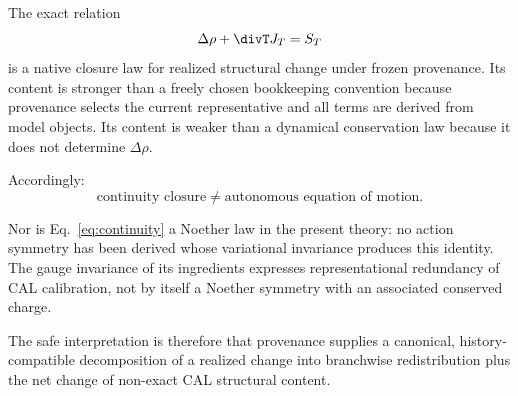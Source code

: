 The exact relation
\begin{equation}
\Delta\rho+\divT J_T=S_T
\end{equation}
is a native closure law for realized structural change under frozen provenance. Its content is stronger than a freely chosen bookkeeping convention because provenance selects the current representative and all terms are derived from model objects. Its content is weaker than a dynamical conservation law because it does not determine $\Delta\rho$.

Accordingly:
\begin{equation}
\boxed{
\text{continuity closure}
\neq
\text{autonomous equation of motion}.
}
\end{equation}

Nor is Eq.~\eqref{eq:continuity} a Noether law in the present theory: no action symmetry has been derived whose variational invariance produces this identity. The gauge invariance of its ingredients expresses representational redundancy of CAL calibration, not by itself a Noether symmetry with an associated conserved charge.

The safe interpretation is therefore that provenance supplies a canonical, history-compatible decomposition of a realized change into branchwise redistribution plus the net change of non-exact CAL structural content.